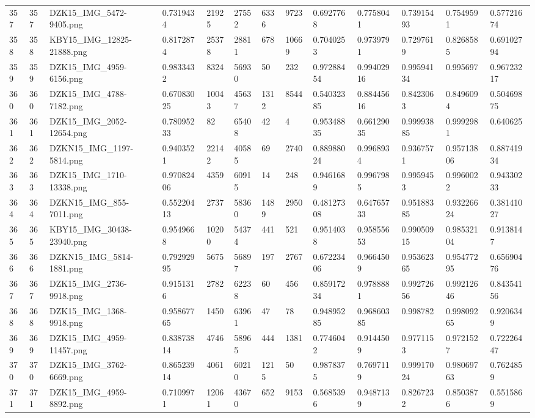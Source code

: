 \documentclass[11pt, a4paper, twoside]{report}
\begin{document}
\begin{longtable}[c]{@{}lllllllllllll@{}}
357 & 357 & DZK15\_IMG\_5472-9405.png & 0.7319434 & 21925 & 27552 & 6336 & 9723 & 0.6927768 & 0.7758041 & 0.73915493 & 0.7549591 & 0.57721674 \\
358 & 358 & KBY15\_IMG\_12825-21888.png & 0.8172874 & 25378 & 28811 & 678 & 10669 & 0.7040253 & 0.9739791 & 0.7297619 & 0.8268585 & 0.69102794 \\
359 & 359 & DZK15\_IMG\_4959-6156.png & 0.9833432 & 8324 & 56930 & 50 & 232 & 0.97288454 & 0.99402916 & 0.99594134 & 0.995697 & 0.96723217 \\
360 & 360 & DZK15\_IMG\_4788-7182.png & 0.67083025 & 10043 & 45637 & 1312 & 8544 & 0.54032385 & 0.88445616 & 0.8423063 & 0.8496094 & 0.50469875 \\
361 & 361 & DZK15\_IMG\_2052-12654.png & 0.78095233 & 82 & 65408 & 42 & 4 & 0.95348835 & 0.66129035 & 0.99993885 & 0.9992981 & 0.640625 \\
362 & 362 & DZKN15\_IMG\_1197-5814.png & 0.9403521 & 22142 & 40585 & 69 & 2740 & 0.88988024 & 0.9968934 & 0.9367571 & 0.95713806 & 0.88741934 \\
363 & 363 & DZK15\_IMG\_1710-13338.png & 0.97082406 & 4359 & 60915 & 14 & 248 & 0.9461689 & 0.9967985 & 0.9959453 & 0.9960022 & 0.94330233 \\
364 & 364 & DZKN15\_IMG\_855-7011.png & 0.55220413 & 2737 & 58360 & 1489 & 2950 & 0.48127308 & 0.64765733 & 0.95188385 & 0.93226624 & 0.38141027 \\
365 & 365 & KBY15\_IMG\_30438-23940.png & 0.9549668 & 10200 & 54374 & 441 & 521 & 0.9514038 & 0.95855653 & 0.99050915 & 0.98532104 & 0.9138147 \\
366 & 366 & DZKN15\_IMG\_5814-1881.png & 0.79292995 & 5675 & 56897 & 197 & 2767 & 0.67223406 & 0.9664509 & 0.95362365 & 0.95477295 & 0.65690476 \\
367 & 367 & DZK15\_IMG\_2736-9918.png & 0.9151316 & 2782 & 62238 & 60 & 456 & 0.85917234 & 0.9788881 & 0.99272656 & 0.99212646 & 0.84354156 \\
368 & 368 & DZK15\_IMG\_1368-9918.png & 0.95867765 & 1450 & 63961 & 47 & 78 & 0.94895285 & 0.96860385 & 0.998782 & 0.99809265 & 0.9206349 \\
369 & 369 & DZK15\_IMG\_4959-11457.png & 0.83873814 & 4746 & 58965 & 444 & 1381 & 0.7746042 & 0.9144509 & 0.9771153 & 0.9721527 & 0.72226447 \\
370 & 370 & DZK15\_IMG\_3762-6669.png & 0.86523914 & 4061 & 60210 & 1215 & 50 & 0.9878375 & 0.7697119 & 0.99917024 & 0.98069763 & 0.7624859 \\
371 & 371 & DZK15\_IMG\_4959-8892.png & 0.7109971 & 12061 & 43670 & 652 & 9153 & 0.5685396 & 0.9487139 & 0.8267232 & 0.8503876 & 0.5515869 \\

\end{longtable}
\end{document}
